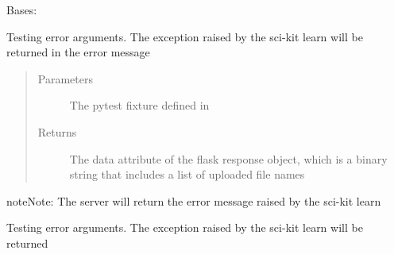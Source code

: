 \documentclass[letterpaper,10pt,english]{sphinxmanual}
\begin{document}
\begin{fulllineitems}
\label{\detokenize{tests:tests.test_cloudmesh.TestLinearRegression}}
Bases: 

\begin{fulllineitems}
\label{\detokenize{tests:tests.test_cloudmesh.TestLinearRegression.test_errors}}
Testing error arguments. The exception raised by the sci-kit learn will be returned in the error message
\begin{quote}\begin{description}
\item[{Parameters}] \leavevmode
{} \textendash{} The pytest fixture defined in {\hyperref[\detokenize{tests:module-tests.conftest}]{}}

\item[{Returns}] \leavevmode
The data attribute of the flask response object, which is a binary string that includes a list of uploaded
file names

\end{description}\end{quote}

\begin{sphinxadmonition}{note}{Note:}
The server will return the error message raised by the sci-kit learn
\end{sphinxadmonition}

\end{fulllineitems}


\begin{fulllineitems}
\label{\detokenize{tests:tests.test_cloudmesh.TestLinearRegression.test_linear_regression}}
Testing error arguments. The exception raised by the sci-kit learn will be returned


\end{fulllineitems}
\end{fulllineitems}
\end{document}
